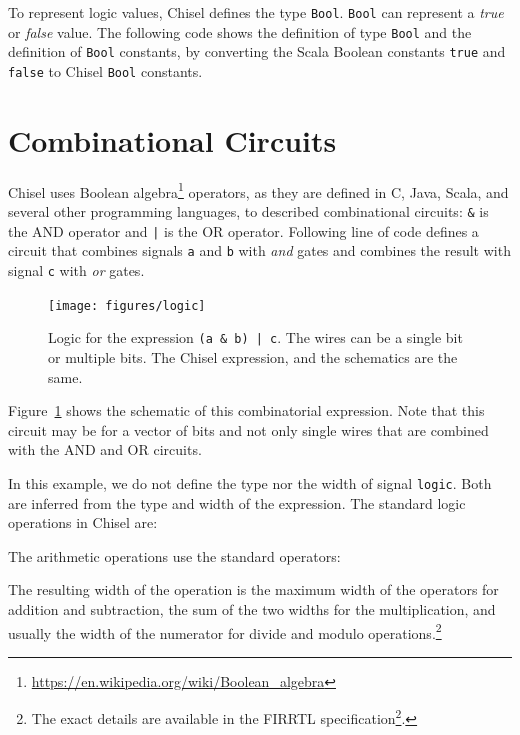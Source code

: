\documentclass[%
    10pt,
    headinclude, footexclude,
    openright, %
    notitlepage,
    cleardoubleempty,
    headsepline,
    pointlessnumbers,
    bibtotoc, idxtotoc,
    ]{scrbook}
\newcommand{\code}[1]{{\small{\texttt{#1}}}}
\newcommand{\myref}[2]{\href{#1}{#2}}
\renewcommand{\myref}[2]{{#2}{\footnote{\url{#1}}}}
\begin{document}
To represent logic values, Chisel defines the type \code{Bool}.
\code{Bool} can represent a \emph{true} or \emph{false} value.
The following code shows the definition of type \code{Bool} and the definition of
\code{Bool} constants, by converting the Scala Boolean constants \code{true}
and \code{false} to Chisel \code{Bool} constants.



\section{Combinational Circuits}

Chisel uses \myref{https://en.wikipedia.org/wiki/Boolean_algebra}{Boolean algebra} operators,
as they are defined in C, Java, Scala, and several other programming languages,
to described combinational circuits: \code{\&} is the AND operator and \code{|} is
the OR operator.
Following line of code defines a circuit that combines signals \code{a} and \code{b} with \emph{and}
gates and combines the result with signal \code{c} with \emph{or} gates.


\begin{figure}
  \centering
  \texttt{[image: figures/logic]}
  \caption{Logic for the expression \code{(a \& b) | c}.
  The wires can be a single bit or multiple bits. The Chisel expression, and the schematics are the same.}
  \label{fig:logic}
\end{figure}


Figure~\ref{fig:logic} shows the schematic of this combinatorial expression.
Note that this circuit may be for a vector of bits and not only single wires
that are combined with the AND and OR circuits.

In this example, we do not define the type nor the width of signal \code{logic}.
Both are inferred from the type and width of the expression.
The standard logic operations in Chisel are:



\noindent The arithmetic operations use the standard operators:



\noindent The resulting width of the operation is the maximum width of the operators for
addition and subtraction, the sum of the two widths for the multiplication, and usually
the width of the numerator for divide and modulo operations.\footnote{The exact
details are available in the \myref{https://github.com/freechipsproject/firrtl/blob/master/spec/spec.pdf}{FIRRTL specification}.}
\end{document}
